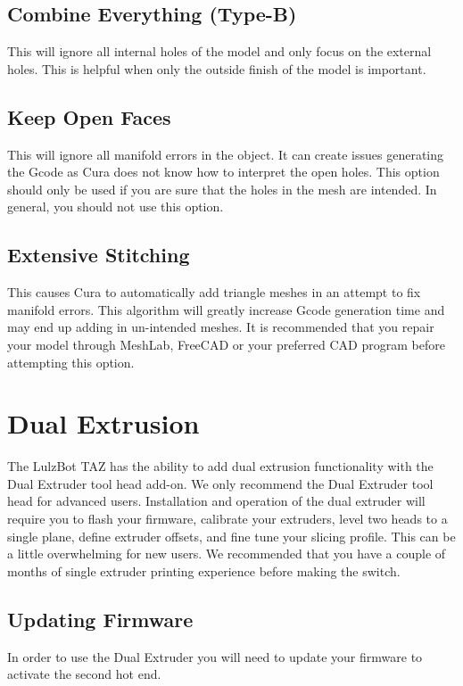 \subsection{Combine Everything (Type-B)}
This will ignore all internal holes of the model and only focus on the external holes. This is helpful when only the outside finish of the model is important.

\subsection{Keep Open Faces}
This will ignore all manifold errors in the object. It can create issues generating the Gcode as Cura does not know how to interpret the open holes. This option should only be used if you are sure that the holes in the mesh are intended. In general, you should not use this option.

\subsection{Extensive Stitching}
This causes Cura to automatically add triangle meshes in an attempt to fix manifold errors. This algorithm will greatly increase Gcode generation time and may end up adding in un-intended meshes. It is recommended that you repair your model through MeshLab, FreeCAD or your preferred CAD program before attempting this option.

\section{Dual Extrusion}
The LulzBot TAZ has the ability to add dual extrusion functionality with the Dual Extruder tool head add-on. We only recommend the Dual Extruder tool head for advanced users. Installation and operation of the dual extruder will require you to flash your firmware, calibrate your extruders, level two heads to a single plane, define extruder offsets, and fine tune your slicing profile. This can be a little overwhelming for new users. We recommended that you have a couple of months of single extruder printing experience before making the switch.

\subsection{Updating Firmware}
In order to use the Dual Extruder you will need to update your firmware to activate the second hot end.

